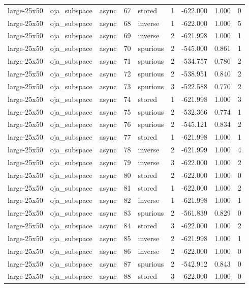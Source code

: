 \begin{tabular}{lllrlrrrr}
large-25x50 & oja\_subspace & async & 67 & stored & 1 & -622.000 & 1.000 & 0 \\
large-25x50 & oja\_subspace & async & 68 & inverse & 1 & -622.000 & 1.000 & 5 \\
large-25x50 & oja\_subspace & async & 69 & inverse & 2 & -621.998 & 1.000 & 1 \\
large-25x50 & oja\_subspace & async & 70 & spurious & 2 & -545.000 & 0.861 & 1 \\
large-25x50 & oja\_subspace & async & 71 & spurious & 2 & -534.757 & 0.786 & 2 \\
large-25x50 & oja\_subspace & async & 72 & spurious & 2 & -538.951 & 0.840 & 2 \\
large-25x50 & oja\_subspace & async & 73 & spurious & 3 & -522.588 & 0.770 & 2 \\
large-25x50 & oja\_subspace & async & 74 & stored & 1 & -621.998 & 1.000 & 3 \\
large-25x50 & oja\_subspace & async & 75 & spurious & 2 & -532.366 & 0.774 & 1 \\
large-25x50 & oja\_subspace & async & 76 & spurious & 2 & -545.121 & 0.834 & 2 \\
large-25x50 & oja\_subspace & async & 77 & stored & 1 & -621.998 & 1.000 & 1 \\
large-25x50 & oja\_subspace & async & 78 & inverse & 2 & -621.999 & 1.000 & 4 \\
large-25x50 & oja\_subspace & async & 79 & inverse & 3 & -622.000 & 1.000 & 2 \\
large-25x50 & oja\_subspace & async & 80 & stored & 2 & -622.000 & 1.000 & 0 \\
large-25x50 & oja\_subspace & async & 81 & stored & 1 & -622.000 & 1.000 & 2 \\
large-25x50 & oja\_subspace & async & 82 & inverse & 1 & -621.998 & 1.000 & 1 \\
large-25x50 & oja\_subspace & async & 83 & spurious & 2 & -561.839 & 0.829 & 0 \\
large-25x50 & oja\_subspace & async & 84 & stored & 3 & -622.000 & 1.000 & 2 \\
large-25x50 & oja\_subspace & async & 85 & inverse & 2 & -621.998 & 1.000 & 1 \\
large-25x50 & oja\_subspace & async & 86 & inverse & 2 & -622.000 & 1.000 & 0 \\
large-25x50 & oja\_subspace & async & 87 & spurious & 2 & -542.912 & 0.843 & 0 \\
large-25x50 & oja\_subspace & async & 88 & stored & 3 & -622.000 & 1.000 & 0 \\

\end{tabular}
